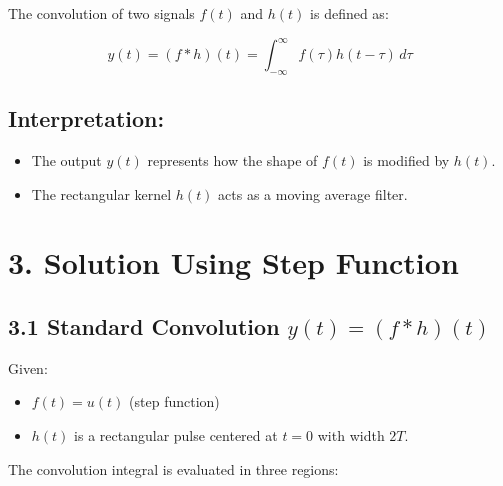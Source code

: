 The convolution of two signals \( f(t) \) and \( h(t) \) is defined as:

\begin{equation}
y(t) = (f * h)(t) = \int_{-\infty}^{\infty} f(\tau) h(t - \tau) \, d\tau
\end{equation}

\subsection*{Interpretation:}
\begin{itemize}
    \item The output \( y(t) \) represents how the shape of \( f(t) \) is modified by \( h(t) \).
    \item The rectangular kernel \( h(t) \) acts as a moving average filter.
\end{itemize}

\section*{3. Solution Using Step Function}

\subsection*{3.1 Standard Convolution \( y(t) = (f * h)(t) \)}

Given:
\begin{itemize}
    \item \( f(t) = u(t) \) (step function)
    \item \( h(t) \) is a rectangular pulse centered at \( t = 0 \) with width \( 2T \).
\end{itemize}

The convolution integral is evaluated in three regions:

